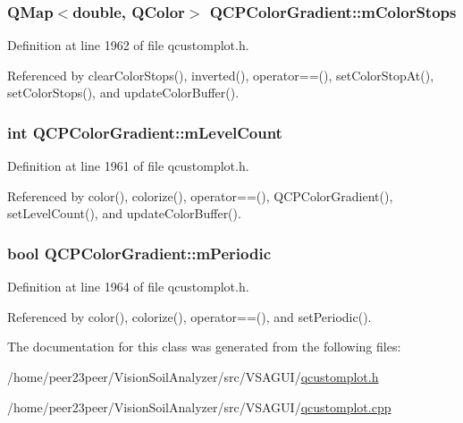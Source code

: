 \subsubsection[{m\+Color\+Stops}]{\setlength{\rightskip}{0pt plus 5cm}Q\+Map$<$double, Q\+Color$>$ Q\+C\+P\+Color\+Gradient\+::m\+Color\+Stops\hspace{0.3cm}{\ttfamily [protected]}}\label{class_q_c_p_color_gradient_a9e11a2b0974ef289d12c324822bc3a3e}


Definition at line 1962 of file qcustomplot.\+h.



Referenced by clear\+Color\+Stops(), inverted(), operator==(), set\+Color\+Stop\+At(), set\+Color\+Stops(), and update\+Color\+Buffer().

\hypertarget{class_q_c_p_color_gradient_a98fb68e359904b2c991fcae3e38a211a}{}
\subsubsection[{m\+Level\+Count}]{\setlength{\rightskip}{0pt plus 5cm}int Q\+C\+P\+Color\+Gradient\+::m\+Level\+Count\hspace{0.3cm}{\ttfamily [protected]}}\label{class_q_c_p_color_gradient_a98fb68e359904b2c991fcae3e38a211a}


Definition at line 1961 of file qcustomplot.\+h.



Referenced by color(), colorize(), operator==(), Q\+C\+P\+Color\+Gradient(), set\+Level\+Count(), and update\+Color\+Buffer().

\hypertarget{class_q_c_p_color_gradient_a4b07deeb20ca1ee2d5ea7e01bf0420af}{}
\subsubsection[{m\+Periodic}]{\setlength{\rightskip}{0pt plus 5cm}bool Q\+C\+P\+Color\+Gradient\+::m\+Periodic\hspace{0.3cm}{\ttfamily [protected]}}\label{class_q_c_p_color_gradient_a4b07deeb20ca1ee2d5ea7e01bf0420af}


Definition at line 1964 of file qcustomplot.\+h.



Referenced by color(), colorize(), operator==(), and set\+Periodic().



The documentation for this class was generated from the following files\+:\begin{DoxyCompactItemize}
\item 
/home/peer23peer/\+Vision\+Soil\+Analyzer/src/\+V\+S\+A\+G\+U\+I/\hyperlink{qcustomplot_8h}{qcustomplot.\+h}\item 
/home/peer23peer/\+Vision\+Soil\+Analyzer/src/\+V\+S\+A\+G\+U\+I/\hyperlink{qcustomplot_8cpp}{qcustomplot.\+cpp}\end{DoxyCompactItemize}
